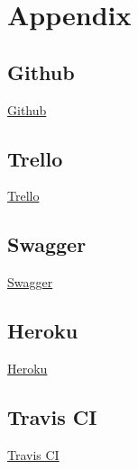 \documentclass{article}
\begin{document}
\section{Appendix}
	\subsection{Github}
		\href{https://github.com/KobusMarais/Cerebero}{Github}
	\subsection{Trello}
		\href{https://trello.com/b/WXh8cJZQ/demo-2}{Trello}
	\subsection{Swagger}
		\href{https://app.swaggerhub.com/apis/KobusMarais/eCivixAPI/1.0.0}{Swagger}
	\subsection{Heroku}
		\href{https://dashboard.heroku.com/apps/ecivix-testing}{Heroku}
	\subsection{Travis CI}
		\href{https://travis-ci.org/KobusMarais/Cerebero/}{Travis CI}
\end{document}
